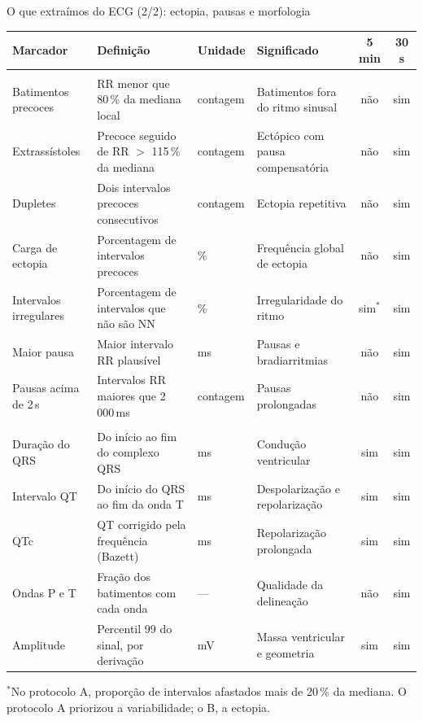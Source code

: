 \documentclass[10pt,aspectratio=169]{beamer}
\newcommand{\fonte}[1]{\par\vfill{\scriptsize\color{cinza}#1}}
\begin{document}
\begin{frame}{O que extraímos do ECG (2/2): ectopia, pausas e morfologia}
  \centering
  \scriptsize
  \setlength{\tabcolsep}{3pt}
  \renewcommand{\arraystretch}{1.0}
  \begin{tabular}{>{\raggedright\arraybackslash}p{2.6cm}>{\raggedright\arraybackslash}p{4.4cm}>{\raggedright\arraybackslash}p{1.1cm}>{\raggedright\arraybackslash}p{3.4cm}cc}
    \toprule
    Marcador & Definição & Unidade & Significado & 5 min & 30 s \\
    \midrule
    \multicolumn{6}{l}{\textit{Ectopia e pausas (pelo ritmo, sem distinguir a origem)}} \\
    Batimentos precoces & RR menor que 80\,\% da mediana local & contagem & Batimentos fora do ritmo sinusal & \cellcolor{pior}não & sim \\
    Extrassístoles & Precoce seguido de RR $>$ 115\,\% da mediana & contagem & Ectópico com pausa compensatória & \cellcolor{pior}não & sim \\
    Dupletes & Dois intervalos precoces consecutivos & contagem & Ectopia repetitiva & \cellcolor{pior}não & sim \\
    Carga de ectopia & Porcentagem de intervalos precoces & \% & Frequência global de ectopia & \cellcolor{pior}não & sim \\
    Intervalos irregulares & Porcentagem de intervalos que não são NN & \% & Irregularidade do ritmo & sim$^{*}$ & sim \\
    Maior pausa & Maior intervalo RR plausível & ms & Pausas e bradiarritmias & \cellcolor{pior}não & sim \\
    Pausas acima de 2\,s & Intervalos RR maiores que 2\,000\,ms & contagem & Pausas prolongadas & \cellcolor{pior}não & sim \\
    \midrule
    \multicolumn{6}{l}{\textit{Morfologia (mediana dos batimentos delineados)}} \\
    Duração do QRS & Do início ao fim do complexo QRS & ms & Condução ventricular & sim & sim \\
    Intervalo QT & Do início do QRS ao fim da onda T & ms & Despolarização e repolarização & sim & sim \\
    QTc & QT corrigido pela frequência (Bazett) & ms & Repolarização prolongada & sim & sim \\
    Ondas P e T & Fração dos batimentos com cada onda & --- & Qualidade da delineação & \cellcolor{pior}não & sim \\
    Amplitude & Percentil 99 do sinal, por derivação & mV & Massa ventricular e geometria & sim & sim \\
    \bottomrule
  \end{tabular}
  \fonte{$^{*}$No protocolo A, proporção de intervalos afastados mais de
    20\,\% da mediana. O protocolo A priorizou a variabilidade; o B, a ectopia.}
\end{frame}
\end{document}
